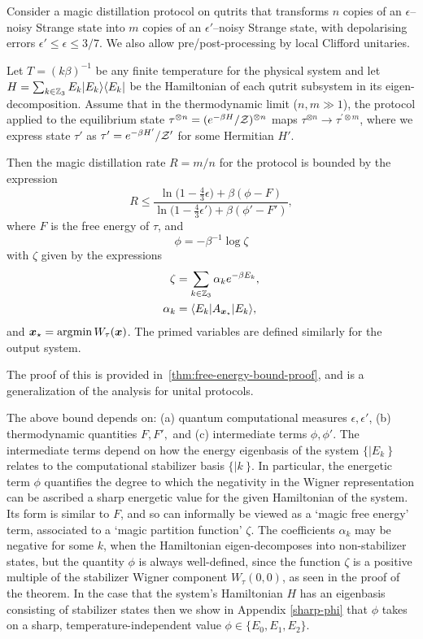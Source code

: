 \documentclass[pra,
aps,
twocolumn,
superscriptaddress,
groupedaddress,
nofootinbib,
reprint
]{revtex4-1}
\begin{document}
\begin{theorem}\label{thm:free-energy}
	Consider a magic distillation protocol on qutrits that transforms $n$ copies of an $\epsilon$--noisy Strange state into $m$ copies of an $\epsilon'$--noisy Strange state, with depolarising errors $\epsilon' \leq \epsilon \leq 3/7$. We also allow pre/post-processing by local Clifford unitaries.
	
	Let $T =(k\beta)^{-1}$ be any finite temperature for the physical system and let $H= \sum_{k \in \mathbb{Z}_3} E_k |E_k\rangle\langle E_k|$ be the Hamiltonian of each qutrit subsystem in its eigen-decomposition.
Assume that in the thermodynamic limit ($n,m \gg 1$), the protocol applied to the equilibrium state $\tau^{\otimes n} = (e^{-\beta H}/\mathcal{Z})^{\otimes n}$ maps $\tau^{\otimes n} \longrightarrow \tau^{\prime \otimes m}$, where we express state $\tau'$ as $\tau' = e^{-\beta H'}/\mathcal{Z}'$ for some Hermitian $H'$.

Then the magic distillation rate $R = m/n$ for the protocol is bounded by the expression
\begin{equation}\label{eq:rate_bounds_proof}
	R \leq \dfrac{\ln{\big( 1-\frac{4}{3}\epsilon \big)} + \beta (\phi - F)}{\ln{\big( 1-\frac{4}{3}\epsilon' \big)} + \beta (\phi' - F')},
\end{equation}
where $F$ is the free energy of $\tau$,  and 
\begin{equation}
	\phi = -\beta^{-1} \log \zeta
\end{equation}
with $\zeta$ given by the expressions
\begin{align}
	\zeta &= \sum_{k\in \mathbb{Z}_3} \alpha_k e^{-\beta E_k}, \nonumber\\
	\alpha_k &= \langle E_k| A_{\boldsymbol{x}_\star} |E_k\rangle,
\end{align}
and $\boldsymbol{x}_\star = \arg\!\min W_\tau(\boldsymbol{x})$. The primed variables are defined similarly for the output system.
\end{theorem}
\noindent The proof of this is provided in~\cref{thm:free-energy-bound-proof}, and is a generalization of the analysis for unital protocols.

The above bound depends on: (a) quantum computational measures $\epsilon, \epsilon'$, (b) thermodynamic quantities $F, F',$  and (c) intermediate terms $\phi, \phi'$. The intermediate terms depend on how the energy eigenbasis of the system $\{|E_k\>\}$ relates to the computational stabilizer basis $\{|k\>\}$.  In particular, the energetic term $\phi$ quantifies the degree to which the negativity in the Wigner representation can be ascribed a sharp energetic value for the given Hamiltonian of the system. Its form is similar to $F$, and so can informally be viewed as a `magic free energy' term, associated to a `magic partition function' $\zeta$. The coefficients $\alpha_k$ may be negative for some $k$, when the Hamiltonian eigen-decomposes into non-stabilizer states, but the quantity $\phi$ is always well-defined, since the function $\zeta$ is a positive multiple of the stabilizer Wigner component $W_\tau(0,0)$, as seen in the proof of the theorem. In the case that the system's Hamiltonian $H$ has an eigenbasis consisting of stabilizer states then we show in Appendix \ref{sharp-phi} that $\phi$ takes on a sharp, temperature-independent value $\phi \in \{E_0,E_1,E_2\}$. 
\end{document}
